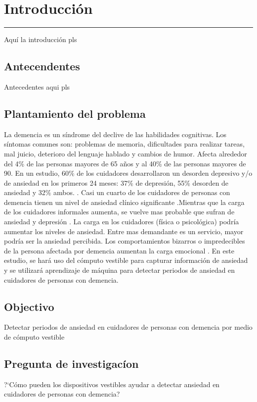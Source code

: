 
\chapter{Introducci\'on}\label{capit:cap1}
\vspace{-2.0325ex}%
\noindent
\rule{\textwidth}{0.5pt}
\vspace{-5.5ex}%
\newcommand{\pushline}{\Indp}

Aqu\'i la introducci\'on pls
\section{Antecendentes}
Antecedentes aqui pls
\section{Plantamiento del problema}
	La demencia es un s\'indrome del declive de las habilidades cognitivas. Los s\'intomas comunes son: problemas de memoria, dificultades para realizar tareas, mal juicio, deterioro del lenguaje hablado y cambios de humor\citep{Aziz}. Afecta alrededor del 4\% de las personas mayores de 65 a\~nos y al 40\% de las personas mayores de 90.
	        En un estudio, 60\% de los cuidadores desarrollaron un desorden depresivo y/o de ansiedad en los primeros 24 meses: 37\% de depresi\'on, 55\% desorden de ansiedad y 32\% ambos. \citep{Joling2014}. Casi un cuarto de los cuidadores de personas con demencia tienen un nivel de ansiedad cl\'inico significante \citep{Cooper200615}.Mientras que la carga de los cuidadores informales aumenta, se vuelve mas probable que sufran de ansiedad y depresi\'on \citep{Denno20131731}. La carga en los cuidadores (f\'isica o psicol\'ogica) podr\'ia aumentar los niveles de ansiedad. Entre mas demandante es un servicio, mayor podr\'ia ser la ansiedad percibida. Los comportamientos bizarros o impredecibles de la persona afectada por demencia aumentan la carga emocional \citep{Rosa201054}. En este estudio, se har\'a uso del c\'omputo vestible para capturar informaci\'on de ansiedad y se utilizar\'a aprendizaje de m\'aquina para detectar periodos de ansiedad en cuidadores de personas con demencia.

\section{Objectivo}
	Detectar periodos de ansiedad en cuidadores de personas con demencia por medio de c\'omputo vestible
\section{Pregunta de investigac\'ion}
	?`C\'omo pueden los dispositivos vestibles ayudar a detectar ansiedad en cuidadores de personas con demencia?
